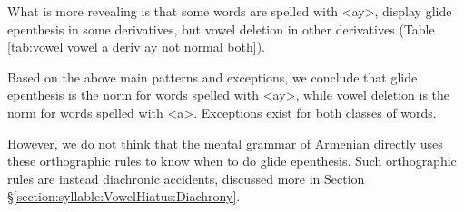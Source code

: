 {	What is more revealing is that some words are spelled with <ay>, display glide epenthesis in some derivatives, but vowel deletion in other derivatives (Table \ref{tab:vowel vowel a deriv ay not normal both}). 
	
	
	
	\begin{table}[H]
		\centering
		\caption{Vowel deletion or glide deletion   in some   stems with final [ɑ]  <ay>}
		\label{tab:vowel vowel a deriv ay not normal both}
	\end{table}
	
	Based on the above main patterns and exceptions, we conclude that glide epenthesis is the norm for words spelled with <ay>, while vowel deletion is the norm for words spelled with <a>. Exceptions exist for both classes of words. 
	
	
	However, we do not think that the mental grammar of Armenian directly uses these orthographic rules to know when to do glide epenthesis. Such orthographic rules are instead diachronic accidents, discussed more in Section \S\ref{section:syllable:VowelHiatus:Diachrony}. 
	
}
